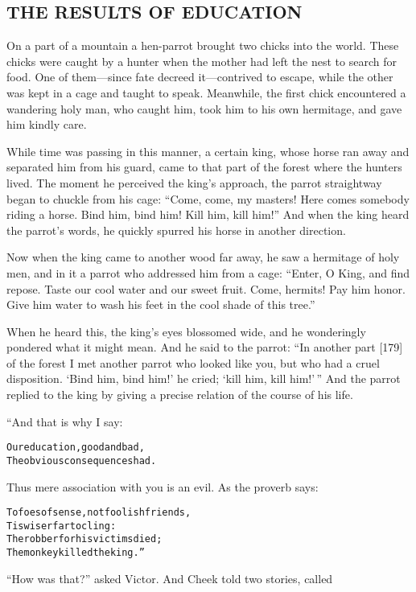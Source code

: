 \documentclass{article}
\renewenvironment{verbatim}{\begin{alltt}\normalfont\begin{centering}}{\end{centering}\end{alltt}}
\begin{document}
\subsection{THE RESULTS OF EDUCATION}

On a part of a mountain a hen-parrot brought two chicks into the
world. These chicks were caught by a hunter when the mother had
left the nest to search for food. One of them---since fate decreed
it---contrived to escape, while the other was kept in a cage and
taught to speak. Meanwhile, the first chick encountered a wandering
holy man, who caught him, took him to his own hermitage, and gave
him kindly care.

While time was passing in this manner, a certain king, whose horse
ran away and separated him from his guard, came to that part of the
forest where the hunters lived. The moment he perceived the king's
approach, the parrot straightway began to chuckle from his cage:
``Come, come, my masters! Here comes somebody riding a horse. Bind him, bind him! Kill him, kill him!''
And when the king heard the parrot's words, he quickly spurred his
horse in another direction.

Now when the king came to another wood far away, he saw a hermitage
of holy men, and in it a parrot who addressed him from a cage:
``Enter, O King, and find repose. Taste our cool water and our sweet fruit. Come, hermits! Pay him honor. Give him water to wash his feet in the cool shade of this tree.''

When he heard this, the king's eyes blossomed wide, and he
wonderingly pondered what it might mean. And he said to the parrot:
``In another part [179] of the forest I met another parrot who looked like you, but who had a cruel disposition. `Bind him, bind him!' he cried; `kill him, kill him!'\,''
And the parrot replied to the king by giving a precise relation of
the course of his life.

“And that is why I say:

\begin{verbatim}
Our education, good and bad,
The obvious consequences had.
\end{verbatim}
Thus mere association with you is an evil. As the proverb says:

\begin{verbatim}
To foes of sense, not foolish friends,
    Tis wiser far to cling:
The robber for his victims died;
    The monkey killed the king.”
\end{verbatim}
``How was that?'' asked Victor. And Cheek told two stories, called
\end{document}
